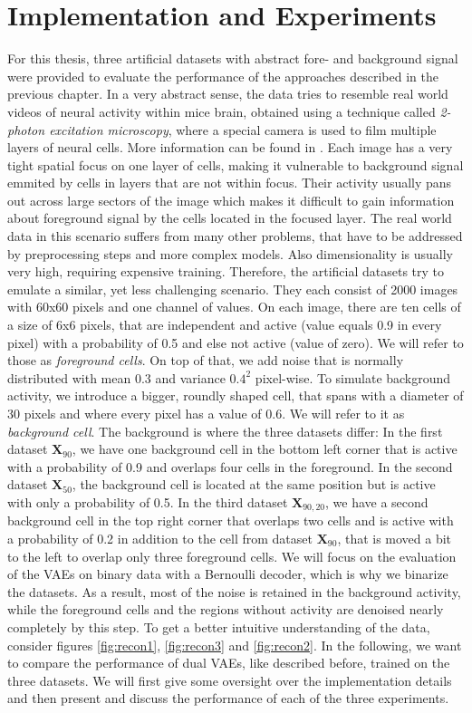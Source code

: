 \documentclass[12pt]{report}
\theoremstyle{definition}
\begin{document}
\chapter{Implementation and Experiments}
For this thesis, three artificial datasets with abstract fore- and background signal were provided to evaluate the performance of the approaches described in the previous chapter. In a very abstract sense, the data tries to resemble real world videos of neural activity within mice brain, obtained using a technique called \emph{2-photon excitation microscopy}, where a special camera is used to film multiple layers of neural cells. More information can be found in \cite{phot}. Each image has a very tight spatial focus on one layer of cells, making it vulnerable to background signal emmited by cells in layers that are not within focus. Their activity usually pans out across large sectors of the image which  makes it difficult to gain information about foreground signal by the cells located in the focused layer. The real world data in this scenario suffers from many other problems, that have to be addressed by preprocessing steps and more complex models. Also dimensionality is usually very high, requiring expensive training.
Therefore, the artificial datasets try to emulate a similar, yet less challenging scenario. They each consist of 2000 images with 60x60 pixels and one channel of values. On each image, there are ten cells of a size of 6x6 pixels, that are independent and active (value equals 0.9 in every pixel) with a probability of 0.5 and else not active (value of zero).  We will refer to those as \emph{foreground cells}. On top of that, we add noise that is normally distributed with mean $0.3$ and variance $0.4^2$ pixel-wise. To simulate background activity, we introduce a bigger, roundly shaped cell, that spans with a diameter of 30 pixels and where every pixel has a value of 0.6. We will refer to it as \emph{background cell}. The background is where the three datasets differ: In the first dataset $\mathbf{X}_{90}$, we have one background cell in the bottom left corner that is active with a probability of 0.9 and overlaps four cells in the foreground. In the second dataset $\mathbf{X}_{50}$, the background cell is located at the same position but is active with only a probability of 0.5. In the third dataset $\mathbf{X}_{90, 20}$, we have a second background cell in the top right corner that overlaps two cells and is active with a probability of 0.2 in addition to the cell from dataset $\mathbf{X}_{90}$, that is moved a bit to the left to overlap only three foreground cells. We will focus on the evaluation of the VAEs on binary data with a Bernoulli decoder, which is why we binarize the datasets. As a result, most of the noise is retained in the background activity, while the foreground cells and the regions without activity are denoised nearly completely by this step. To get a better intuitive understanding of the data, consider figures \ref{fig:recon1}, \ref{fig:recon3} and \ref{fig:recon2}. In the following, we want to compare the performance of dual VAEs, like described before, trained on the three datasets. We will first give some oversight over the implementation details and then present and discuss the performance of each of the three experiments.
\end{document}
